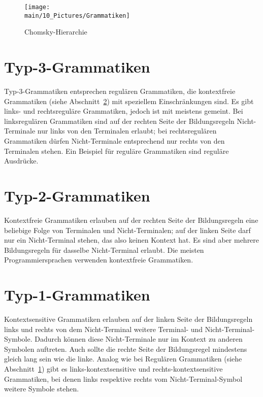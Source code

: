 \documentclass[../InterneDSLs.tex]{subfiles}
\begin{document}
\begin{figure}
\centering
\texttt{[image: \\main/10\_Pictures/Grammatiken]}
\caption{Chomsky-Hierarchie}
\label{fig:chomkskyhierarchie}
\end{figure}

\section{Typ-3-Grammatiken}\label{sec:refulaeregrammatik}
Typ-3-Grammatiken entsprechen regulären Grammatiken, die kontextfreie Grammatiken (siehe Abschnitt~\ref{sec:kontextfreiegrammatik}) mit speziellem Einschränkungen sind. Es gibt links- und rechtsreguläre Grammatiken, jedoch ist mit  meistens  gemeint. Bei linksregulären Grammatiken sind auf der rechten Seite der Bildungsregeln Nicht-Terminale nur links von den Terminalen erlaubt; bei rechtsregulären Grammatiken dürfen Nicht-Terminale entsprechend nur rechts von den Terminalen stehen. Ein Beispiel für reguläre Grammatiken sind reguläre Ausdrücke.

\section{Typ-2-Grammatiken}\label{sec:kontextfreiegrammatik}
Kontextfreie Grammatiken erlauben auf der rechten Seite der Bildungsregeln eine beliebige Folge von Terminalen und Nicht-Terminalen; auf der linken Seite darf nur ein Nicht-Terminal stehen, das also keinen Kontext hat. Es sind aber mehrere Bildungsregeln für dasselbe Nicht-Terminal erlaubt. Die meisten Programmiersprachen verwenden kontextfreie Grammatiken.\cite{Fowler.2010}

\section{Typ-1-Grammatiken}\label{sec:kontextsensitivegrammatik}
Kontextsensitive Grammatiken erlauben auf der linken Seite der Bildungsregeln links und rechts von dem Nicht-Terminal weitere Terminal- und Nicht-Terminal-Symbole. Dadurch können diese Nicht-Terminale nur im Kontext zu anderen Symbolen auftreten. Auch sollte die rechte Seite der Bildungsregel mindestens gleich lang sein wie die linke. Analog wie bei Regulären Grammatiken (siehe Abschnitt~\ref{sec:refulaeregrammatik}) gibt es links-kontextsensitive und rechts-kontextsensitive Grammatiken, bei denen links respektive rechts vom Nicht-Terminal-Symbol weitere Symbole stehen.
\end{document}
